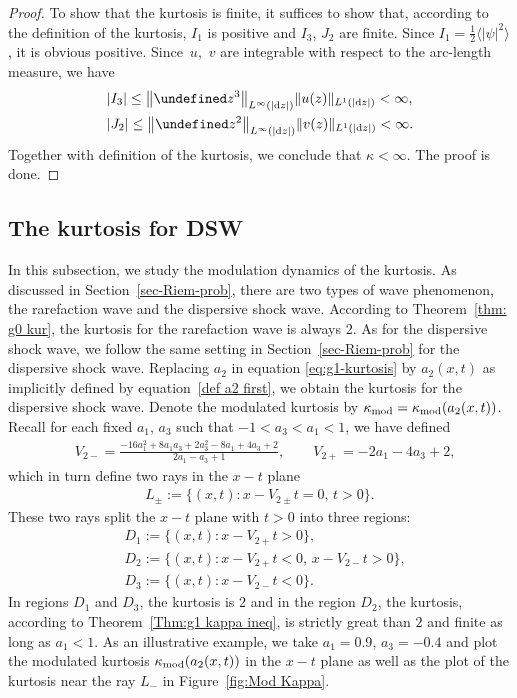 \documentclass[pdftex]{sigma}
\numberwithin{equation}{section}
\let\Im\undefined
\DeclareMathOperator{\Im}{Im}
\begin{document}
\begin{proof}
To show that the kurtosis is finite, it suffices to show that, according to the definition of the kurtosis, $I_1$ is positive and $I_3$, $J_2$ are finite. Since $I_1=\frac{1}{2}\bigl\langle|\psi|^2\bigr\rangle$, it is obvious positive. Since~$u$,~$v$ are integrable with respect to the arc-length measure, we have
\begin{align*}
&|I_3|\leq \bigl\|\Im z^3\bigr\|_{L^\infty(|{\rm d}z|)}\|u(z)\|_{L^1(|{\rm d}z|)}<\infty,\\
&|J_2|\leq \bigl\|\Im z^2\bigr\|_{L^\infty(|{\rm d}z|)}\|v(z)\|_{L^1(|{\rm d}z|)}<\infty.
\end{align*}
Together with definition of the kurtosis, we conclude that $\kappa<\infty$. The proof is done.
\end{proof}

\subsection{The kurtosis for DSW}

In this subsection, we study the modulation dynamics of the kurtosis. As discussed in Section~\ref{sec-Riem-prob},
there are two types of wave phenomenon, the rarefaction wave and the dispersive shock wave. According to Theorem~\ref{thm: g0 kur}, the kurtosis for the rarefaction wave is always $2$. As for the dispersive shock wave, we follow the same setting in Section~\ref{sec-Riem-prob} for the dispersive shock wave. Replacing $a_2$ in equation \eqref{eq:g1-kurtosis} by $a_2(x,t)$ as implicitly defined by equation~\eqref{def a2 first}, we obtain the kurtosis for the dispersive shock wave. Denote the modulated kurtosis by $\kappa_{\rm mod}=\kappa_{\rm mod}(a_2(x,t))$. Recall for each fixed $a_1$, $a_3$ such that $-1<a_3<a_1<1$, we have defined
\begin{align*}
&V_{2-}=\frac{-16a_1^2+8a_1a_3+2a_3^2-8a_1+4a_3+2}{2a_1-a_3+1},\qquad V_{2+}=-2a_1-4a_3+2,
\end{align*}
which in turn define two rays in the $x-t$ plane
\begin{align*}
L_{\pm}:=\{(x,t)\colon x-V_{2\pm}t=0,\,t>0\}.
\end{align*}
These two rays split the $x-t$ plane with $t>0$ into three regions:
\begin{align*}
&D_1:=\{(x,t)\colon x-V_{2+}t>0\},\\
&D_2:=\{(x,t)\colon x-V_{2+}t<0,\, x-V_{2-}t>0\},\\
&D_3:=\{(x,t)\colon x-V_{2-}t<0\}.
\end{align*}
In regions $D_1$ and $D_3$, the kurtosis is $2$ and in the region $D_2$, the kurtosis, according to Theorem~\ref{Thm:g1 kappa ineq}, is strictly great than $2$ and finite as long as $a_1<1$. As an illustrative example, we take $a_1=0.9$, $a_3=-0.4$ and plot the modulated kurtosis $\kappa_{\rm mod}(a_2(x,t))$ in the $x-t$ plane as well as the plot of the kurtosis near the ray $L_-$ in Figure~\ref{fig:Mod Kappa}.
\end{document}
